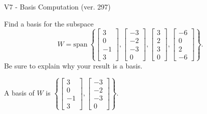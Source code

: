 \begin{exercise}
  \begin{exerciseTitle}V7 - Basis Computation (ver. 297)\end{exerciseTitle}
  \begin{exerciseStatement}
    Find a basis for the subspace 
\[W=\mathrm{span}\ \left\{\left[\begin{array}{r}
3 \\
0 \\
-1 \\
3
\end{array}\right] , \left[\begin{array}{r}
-3 \\
-2 \\
-3 \\
0
\end{array}\right] , \left[\begin{array}{r}
3 \\
2 \\
3 \\
0
\end{array}\right] , \left[\begin{array}{r}
-6 \\
0 \\
2 \\
-6
\end{array}\right]\right\}.\]
 Be sure to explain why your result is a basis.


  \end{exerciseStatement}
  \begin{exerciseAnswer}
   A basis of \(W\) is  \(\left\{\left[\begin{array}{r}
3 \\
0 \\
-1 \\
3
\end{array}\right] , \left[\begin{array}{r}
-3 \\
-2 \\
-3 \\
0
\end{array}\right]\right\}\).
  


  \end{exerciseAnswer}
\end{exercise}